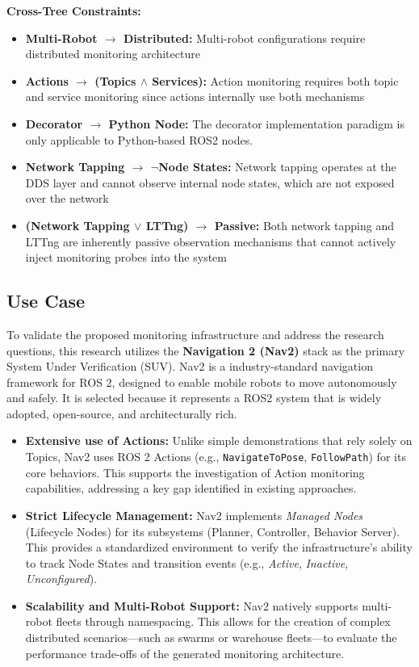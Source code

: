\textbf{Cross-Tree Constraints:}
\begin{itemize}[leftmargin=*]
    \item \textbf{Multi-Robot $\rightarrow$ Distributed:} Multi-robot configurations require distributed monitoring architecture
    \item \textbf{Actions $\rightarrow$ (Topics $\land$ Services):} Action monitoring requires both topic and service monitoring since actions internally use both mechanisms
    \item \textbf{Decorator $\rightarrow$ Python Node:} The decorator implementation paradigm is only applicable to Python-based ROS2 nodes.
    \item \textbf{Network Tapping $\rightarrow$ $\lnot$Node States:} Network tapping operates at the DDS layer and cannot observe internal node states, which are not exposed over the network
    \item \textbf{(Network Tapping $\lor$ LTTng) $\rightarrow$ Passive:} Both network tapping and LTTng are inherently passive observation mechanisms that cannot actively inject monitoring probes into the system
\end{itemize}

\subsection{Use Case}
To validate the proposed monitoring infrastructure and address the research questions, this research utilizes the \textbf{Navigation 2 (Nav2)} stack as the primary System Under Verification (SUV). Nav2 is a industry-standard navigation framework for ROS 2, designed to enable mobile robots to move autonomously and safely. It is selected because it represents a ROS2 system that is widely adopted, open-source, and architecturally rich.

\begin{itemize}
    \item \textbf{Extensive use of Actions:} Unlike simple demonstrations that rely solely on Topics, Nav2 uses ROS 2 Actions (e.g., \texttt{NavigateToPose}, \texttt{FollowPath}) for its core behaviors. This supports the investigation of Action monitoring capabilities, addressing a key gap identified in existing approaches.
    \item \textbf{Strict Lifecycle Management:} Nav2 implements \textit{Managed Nodes} (Lifecycle Nodes) for its subsystems (Planner, Controller, Behavior Server). This provides a standardized environment to verify the infrastructure's ability to track Node States and transition events (e.g., \textit{Active}, \textit{Inactive}, \textit{Unconfigured}).
    \item \textbf{Scalability and Multi-Robot Support:} Nav2 natively supports multi-robot fleets through namespacing. This allows for the creation of complex distributed scenarios—such as swarms or warehouse fleets—to evaluate the performance trade-offs of the generated monitoring architecture.
\end{itemize}

